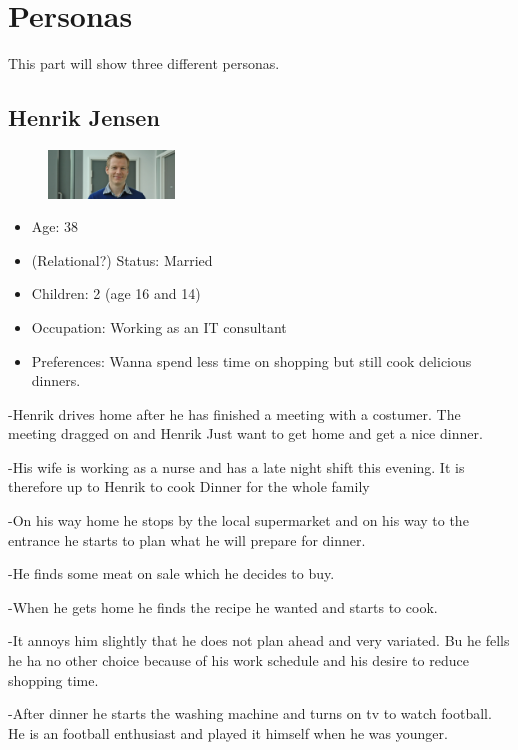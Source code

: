 \section{Personas}
This part will show three different personas.

\subsection{Henrik Jensen}
\begin{figure}[H]
	\includegraphics[width=0.30\textwidth]{Grafik/FoodPlanner/PersonaHenrikJensen}
	\label{PersonaHenrikJensen}
\end{figure}
\begin{itemize}
	\item Age: 38
	\item (Relational?) Status: Married
	\item Children: 2 (age 16 and 14)
	\item Occupation: Working as an IT consultant
	\item Preferences: Wanna spend less time on shopping but still cook delicious dinners.
\end{itemize}
-Henrik drives home after he has finished a meeting with a costumer. The meeting dragged on and Henrik Just want to get home and get a nice dinner.

-His wife is working as a nurse and has a late night shift this evening. It is therefore up to Henrik to cook Dinner for the whole family

-On his way home he stops by the local supermarket and on his way to the entrance he starts to plan what he will prepare for dinner.

-He finds some meat on sale which he decides to buy.

-When he gets home he finds the recipe he wanted and starts to cook.

-It annoys him slightly that he does not plan ahead and very variated. Bu he fells he ha no other choice because of his work schedule and his desire to reduce shopping time.

-After dinner he starts the washing machine and turns on tv to watch football. He is an football enthusiast and played it himself when he was younger. 

